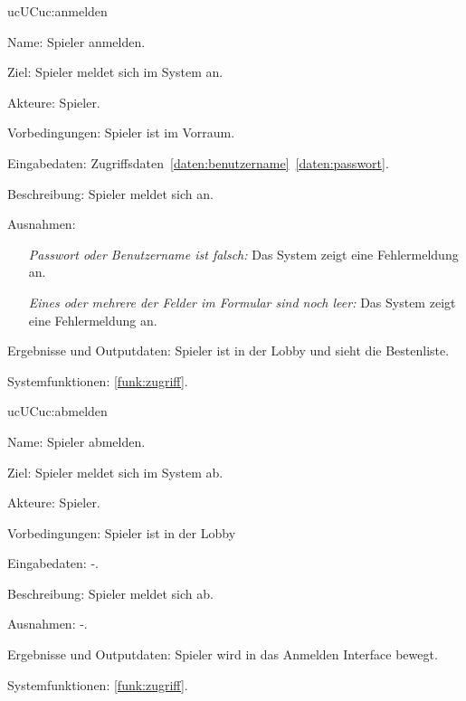 \begin{description}[leftmargin=5em, style=sameline]
	
	\begin{lhp}{uc}{UC}{uc:anmelden} 
		\item [Name:] Spieler anmelden.
		\item [Ziel:] Spieler meldet sich im System an.
		\item [Akteure:] Spieler.
		\item [Vorbedingungen:] Spieler ist im Vorraum.
		\item [Eingabedaten:] Zugriffsdaten~\ref{daten:benutzername}~\ref{daten:passwort}.
		\item [Beschreibung:] Spieler meldet sich an.							
		\item [Ausnahmen:] \hfill
			\begin{itemize} 
				\item[] \textit{Passwort oder Benutzername ist falsch:} Das System zeigt eine Fehlermeldung an.
				\item[] \textit{Eines oder mehrere der Felder im Formular sind noch leer:} Das System zeigt eine Fehlermeldung an.
			\end{itemize}
		\item [Ergebnisse und Outputdaten:] Spieler ist in der Lobby und sieht die Bestenliste.	
		\item [Systemfunktionen:] \ref{funk:zugriff}.
	\end{lhp}
	
	\begin{lhp}{uc}{UC}{uc:abmelden} 
		\item [Name:] Spieler abmelden.
		\item [Ziel:] Spieler meldet sich im System ab.
		\item [Akteure:] Spieler.
		\item [Vorbedingungen:] Spieler ist in der Lobby
		\item [Eingabedaten:] -.
		\item [Beschreibung:] Spieler meldet sich ab.	
		\item [Ausnahmen:] -.
		\item [Ergebnisse und Outputdaten:]	Spieler wird in das Anmelden Interface bewegt.
		\item [Systemfunktionen:] \ref{funk:zugriff}.
	\end{lhp}
	

\end{description}
